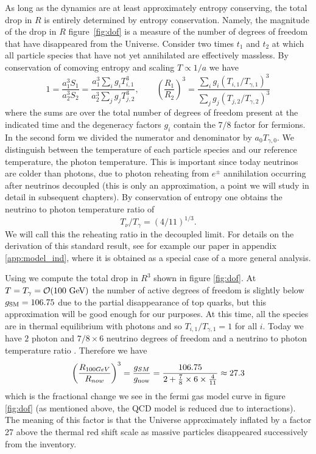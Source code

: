 As long as the dynamics are at least approximately entropy conserving, the total drop in $R$ is entirely determined by entropy conservation. Namely, the magnitude of the drop in $R$ figure~\ref{fig:dof} is a measure of the number of degrees of freedom that have disappeared from the Universe. Consider two times $t_1$ and $t_2$ at which all particle species that have not yet annihilated are effectively massless. By conservation of comoving entropy and scaling $T\propto 1/a$ we have
\begin{equation}\label{r_ratio}
1=\frac{a_1^3S_{1}}{a_2^3 S_2}=\frac{a_1^3\sum_ig_i T_{i,1}^3}{a_2^3\sum_j g_j T_{j,2}^3},\qquad \left(\frac{R_1}{R_2}\right)^3=\frac{\sum_ig_i (T_{i,1}/T_{\gamma,1})^3}{\sum_j g_j (T_{j,2}/T_{\gamma,2})^3}
\end{equation}
where the sums are over the total number of degrees of freedom present at the indicated time and the degeneracy factors $g_i$ contain the $7/8$ factor for fermions. In the second form we divided the numerator and denominator by $a_{0}T_{\gamma,0}$. We distinguish between the temperature of each particle species and our reference temperature, the photon temperature. This is important since today neutrinos are colder than photons, due to photon reheating from $e^\pm$ annihilation occurring after neutrinos decoupled (this is only an approximation, a point we will study in detail in subsequent chapters). By conservation of entropy one obtains the neutrino to photon temperature ratio of
\begin{equation}\label{T_nu_T_gamma}
T_\nu/T_\gamma=({4}/{11})^{1/3}.
\end{equation}
We will call this the reheating ratio in the decoupled limit. For details on the derivation of this standard result, see for example our paper in appendix \ref{app:model_ind}, where it is obtained as a special case of a more general analysis. 

Using  we compute the total drop in $R^3$ shown in figure \ref{fig:dof}. At $T=T_\gamma=\mathcal{O}(100\text{ GeV})$ the number of active degrees of freedom is slightly below $g_{\rm SM}=106.75$ due to the partial disappearance of top quarks, but this approximation will be good enough for our purposes. At this time, all the species are in thermal equilibrium with photons and so $T_{i,1}/T_{\gamma,1}=1$ for all $i$. Today we have $2$ photon and $7/8\times 6$ neutrino degrees of freedom and a neutrino to photon temperature ratio . Therefore we have
\begin{equation}
\left(\frac{R_{100GeV}}{R_{now}}\right)^3= \frac{g_{SM}}{g_{\rm now}}=\frac{106.75}{2+\frac{7}{8}\times 6\times \frac{4}{11}}\approx 27.3
\end{equation}
which is the fractional change we see in the fermi gas model curve in figure \ref{fig:dof} (as mentioned above, the QCD model is reduced due to interactions). The meaning of this factor is that the Universe approximately inflated by a factor 27 above the thermal red shift scale as massive particles disappeared successively from the inventory. 

